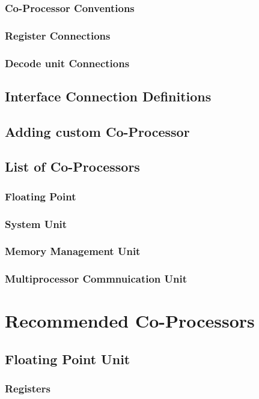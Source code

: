 \documentclass[letterpaper, 11pt]{article}
\begin{document}
\subsubsection{Co-Processor Conventions}
\subsubsection{Register Connections}
\subsubsection{Decode unit Connections}
\subsection{Interface Connection Definitions}
\subsection{Adding custom Co-Processor}
\subsection{List of Co-Processors}
\subsubsection{Floating Point}
\subsubsection{System Unit}
\subsubsection{Memory Management Unit}
\subsubsection{Multiprocessor Commnuication Unit}

\section{Recommended Co-Processors}
\subsection{Floating Point Unit}
\subsubsection{Registers}
\end{document}
